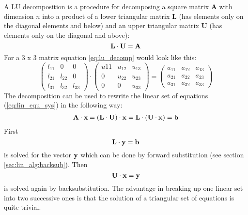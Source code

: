 A LU decomposition is a procedure for decomposing a square matrix {\bf
  A} with
dimension $n$ into a product of a lower triangular matrix {\bf L} (has
elements only on the diagonal elements and below) and
an upper triangular matrix {\bf U} (has elements only on the diagonal
and above):
\begin{equation}
  \label{eq:lu_decomp}
  {\bf L}\cdot{\bf U} ={\bf A} 
\end{equation}
For a 3 x 3 matrix equation \ref{eq:lu_decomp} would look like this: 
\[ \left(
  \begin{array}{ccc}
    l_{11} & 0 & 0 \\
    l_{21} & l_{22} & 0 \\
    l_{31} & l_{32} & l_{33}
    \end{array} \right)
\cdot
\left(
  \begin{array}{ccc}
    u{11} & u_{12} & u_{13} \\
    0 & u_{22} & u_{23}\\
    0 & 0 & u_{33}
    \end{array} \right)
=
\left(
  \begin{array}{ccc}
    a_{11} & a_{12} & a_{13} \\
    a_{21} & a_{22} & a_{23} \\
    a_{31} & a_{32} & a_{33}
    \end{array} \right)
\]
The decomposition can be used to rewrite the linear set of equations
(\ref{eq:lin_equ_sys}) in the following way:
\begin{eqnarray}
  {\bf A}\cdot{\bf x} = ({\bf L}\cdot{\bf U})\cdot{\bf x} = {\bf
    L}\cdot({\bf U}\cdot{\bf x}) = {\bf b}
\end{eqnarray}
First 
\begin{equation}
  {\bf L} \cdot{\bf y} = {\bf b}
\end{equation}
is solved for the vector ${\bf y}$ which can be done by
forward substitution (see section \ref{sec:lin_alg:backsub}). Then 
\begin{equation}
  {\bf U} \cdot{\bf x} = {\bf y}
\end{equation}
is solved again by backsubstitution. 
The advantage in breaking up one linear set into two successive ones
is that the solution of a triangular set of equations is quite trivial.

